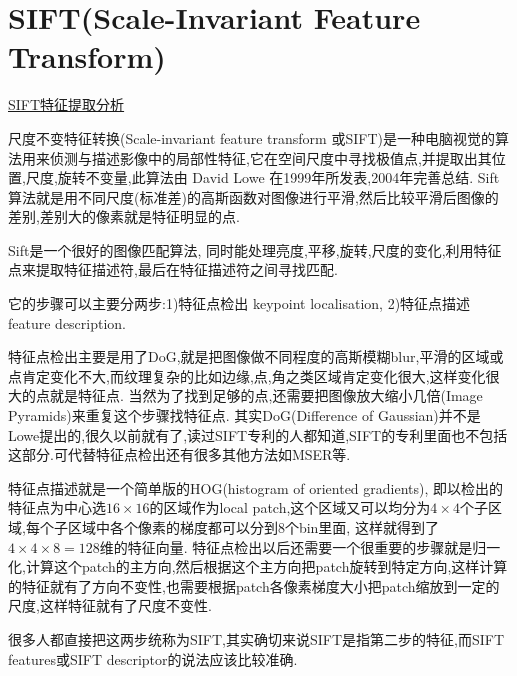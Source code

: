 \section{SIFT(Scale-Invariant Feature Transform)}
\href{http://blog.csdn.net/abcjennifer/article/details/7639681/}{SIFT特征提取分析}

尺度不变特征转换(Scale-invariant feature transform 或SIFT)是一种电脑视觉的算法用来侦测与描述影像中的局部性特征,它在空间尺度中寻找极值点,并提取出其位置,尺度,旋转不变量,此算法由 David Lowe 在1999年所发表,2004年完善总结.
Sift算法就是用不同尺度(标准差)的高斯函数对图像进行平滑,然后比较平滑后图像的差别,差别大的像素就是特征明显的点.

Sift是一个很好的图像匹配算法, 同时能处理亮度,平移,旋转,尺度的变化,利用特征点来提取特征描述符,最后在特征描述符之间寻找匹配.

它的步骤可以主要分两步:1)特征点检出 keypoint localisation, 2)特征点描述 feature description.

特征点检出主要是用了DoG,就是把图像做不同程度的高斯模糊blur,平滑的区域或点肯定变化不大,而纹理复杂的比如边缘,点,角之类区域肯定变化很大,这样变化很大的点就是特征点.
当然为了找到足够的点,还需要把图像放大缩小几倍(Image Pyramids)来重复这个步骤找特征点.
其实DoG(Difference of Gaussian)并不是Lowe提出的,很久以前就有了,读过SIFT专利的人都知道,SIFT的专利里面也不包括这部分.可代替特征点检出还有很多其他方法如MSER等.

特征点描述就是一个简单版的HOG(histogram of oriented gradients), 即以检出的特征点为中心选$16 \times 16$的区域作为local patch,这个区域又可以均分为$4 \times 4$个子区域,每个子区域中各个像素的梯度都可以分到$8$个bin里面,
这样就得到了$4 \times 4 \times 8 = 128$维的特征向量.
特征点检出以后还需要一个很重要的步骤就是归一化,计算这个patch的主方向,然后根据这个主方向把patch旋转到特定方向,这样计算的特征就有了方向不变性,也需要根据patch各像素梯度大小把patch缩放到一定的尺度,这样特征就有了尺度不变性.

很多人都直接把这两步统称为SIFT,其实确切来说SIFT是指第二步的特征,而SIFT features或SIFT descriptor的说法应该比较准确.

